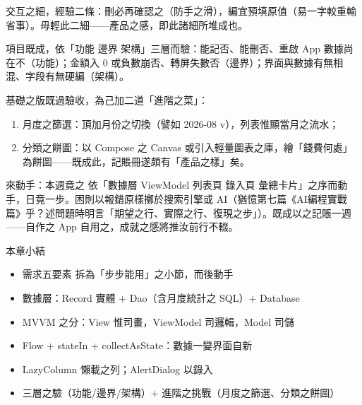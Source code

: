 交互之細，經驗二條：刪必再確認之（防手之滑），編宜預填原值（易一字較重輸省事）。毋輕此二細——產品之感，即此諸細所堆成也。



項目既成，依「功能 邊界 架構」三層而驗：能記否、能刪否、重啟 App 數據尚在不（功能）；金額入 0 或負數崩否、轉屏失數否（邊界）；界面與數據有無相混、字段有無硬編（架構）。

基礎之版既過驗收，為己加二道「進階之菜」：

\begin{enumerate}
  \item 月度之篩選：頂加月份之切換（譬如 2026-08 v），列表惟顯當月之流水；
  \item 分類之餅圖：以 Compose 之 Canvas 或引入輕量圖表之庫，繪「錢費何處」為餅圖——既成此，記賬冊遂頗有「產品之樣」矣。
\end{enumerate}

\begin{tcbpractice}{來動手：本週竟之}
依「數據層 ViewModel 列表頁 錄入頁 彙總卡片」之序而動手，日竟一步。困則以報錯原樣擲於搜索引擎或 AI（猶憶第七篇《AI編程實戰篇》乎？述問題時明言「期望之行、實際之行、復現之步」）。既成以之記賬一週——自作之 App 自用之，成就之感將推汝前行不輟。

\end{tcbpractice}

\begin{tcbsummary}{本章小結}
\begin{itemize}
  \item 需求五要素 拆為「步步能用」之小節，而後動手
  \item 數據層：Record 實體 + Dao（含月度統計之 SQL）+ Database
  \item MVVM 之分：View 惟司畫，ViewModel 司邏輯，Model 司儲
  \item Flow + stateIn + collectAsState：數據一變界面自新
  \item LazyColumn 懶載之列；AlertDialog 以錄入
  \item 三層之驗（功能/邊界/架構）+ 進階之挑戰（月度之篩選、分類之餅圖）
\end{itemize}

\end{tcbsummary}
